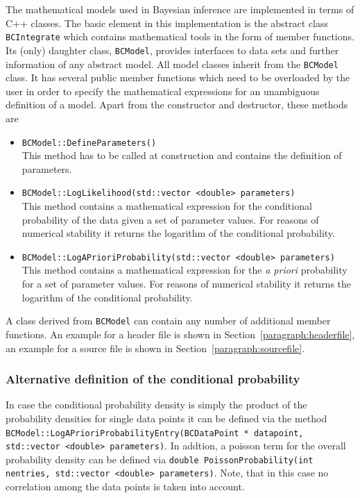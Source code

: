 \documentclass[11pt, a4paper]{article}
\begin{document}
The mathematical models used in Bayesian inference are implemented in
terms of C++ classes. The basic element in this implementation is the
abstract class \verb|BCIntegrate| which contains mathematical tools
in the form of member functions. Its (only) daughter class, \verb|BCModel|, provides
interfaces to data sets and further information of any abstract model. All model classes
inherit from the \verb|BCModel| class. It has several public member functions
which need to be overloaded by the user in order to specify the
mathematical expressions for an unambiguous definition of a model. Apart from the
constructor and destructor, these methods are
% 
\begin{itemize}
\item \verb|BCModel::DefineParameters()| \\
 This method has to be called at construction and contains the
 definition of parameters. 
% 
\item \verb|BCModel::LogLikelihood(std::vector <double> parameters)| \\ 
 This method contains a mathematical expression for the conditional
 probability of the data given a set of parameter values. For reasons
 of numerical stability it returns the logarithm of the conditional
 probability.
%
\item \verb|BCModel::LogAPrioriProbability(std::vector <double> parameters)| \\
 This method contains a mathematical expression for the {\it a priori}
 probability for a set of parameter values. For reasons
 of numerical stability it returns the logarithm of the conditional
 probability.
\end{itemize} 

\noindent 
A class derived from \verb|BCModel| can contain any number of additional 
member functions. An example for a header file is shown in 
Section~\ref{paragraph:headerfile}, an example for a source file is shown 
in Section~\ref{paragraph:sourcefile}. 

\subsubsection{Alternative definition of the conditional probability} 

In case the conditional probability density is simply the product of the probability 
densities for single data points it can be defined via the method 
\verb|BCModel::LogAPrioriProbabilityEntry(BCDataPoint * datapoint, std::vector <double> parameters)|. 
In addtion, a poisson term for the overall probability density can be defined via 
\verb|double PoissonProbability(int nentries, std::vector <double> parameters)|.  Note, that 
in this case no correlation among the data points is taken into account. 
\end{document}
